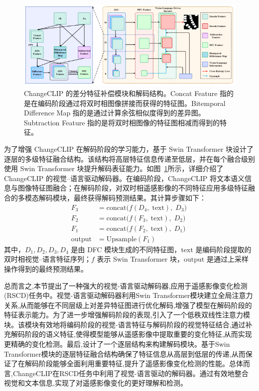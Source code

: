 \begin{figure}[!htbp]
  \centering
  \includegraphics[width=\textwidth]{paper_figures/基于AI基础模型微调的变化检测模型研究/ChangeCLIP/changeclip4.png}
  \caption{ChangeCLIP 的差分特征补偿模块和解码结构。Concat Feature 指的是在编码阶段通过将双时相图像拼接而获得的特征图。Bitemporal Difference Map 指的是通过计算余弦相似度得到的差异图。Subtraction Feature 指的是将双时相图像的特征图相减而得到的特征。}
  \label{fig:changeclip4}
\end{figure}

为了增强 ChangeCLIP 在解码阶段的学习能力，基于 Swin Transformer 块设计了逐层的多级特征融合结构。该结构将高层特征信息传递至低层，并在每个融合级别使用 Swin Transformer 块提升解码表征能力。如图~\ref{fig:changeclip4}所示，详细介绍了 ChangeCLIP 的视觉–语言驱动解码器。在编码阶段，ChangeCLIP 将文本语义信息与图像特征图融合；在解码阶段，对双时相遥感影像的不同特征应用多级特征融合的多模态解码模块，最终获得解码预测结果。其计算步骤如下：
\begin{align}
F_3 &= \mathrm{concat}\bigl(f(D_4,\;\text{text}),\;D_3\bigr)\, \label{eq:changeclip-23}\\
F_2 &= \mathrm{concat}\bigl(f(F_3,\;\text{text}),\;D_2\bigr)\, \label{eq:changeclip-24}\\
F_1 &= \mathrm{concat}\bigl(f(F_2,\;\text{text}),\;D_1\bigr)\, \label{eq:changeclip-25}\\
\mathrm{output} &= \mathrm{Upsample}(F_1)\, \label{eq:changeclip-26}
\end{align}
其中，$D_1, D_2, D_3, D_4$ 是由 DFC 模块生成的不同特征图，$\text{text}$ 是编码阶段提取的双时相视觉–语言特征序列；$f$ 表示 Swin Transformer 块，$\mathrm{output}$ 是通过上采样操作得到的最终预测结果。

总而言之,本节提出了一种强大的视觉-语言驱动解码器,应用于遥感影像变化检测(RSCD)任务中。视觉-语言驱动解码器利用Swin Transformer模块建立全局注意力关系,从而能够在不同层级上对差异特征图进行优化解码,增强了模型在解码阶段的特征表示能力。为了进一步增强解码阶段的表现,引入了一个低秩双线性注意力模块。该模块有效地将编码阶段的视觉-语言特征与解码阶段的视觉特征结合,通过补充解码阶段的语义特征,使得模型能够从遥感影像中提取重要的变化特征,从而实现更精确的变化检测。最后,设计了一个逐层结构来构建解码模块。基于Swin Transformer模块的逐层特征融合结构确保了特征信息从高层到低层的传递,从而保证了在解码阶段能够全面利用重要特征,提升了遥感影像变化检测的性能。总体而言,ChangeCLIP在RSCD任务中利用了视觉-语言驱动的解码器。通过有效地整合视觉和文本信息,实现了对遥感影像变化的更好理解和检测。

